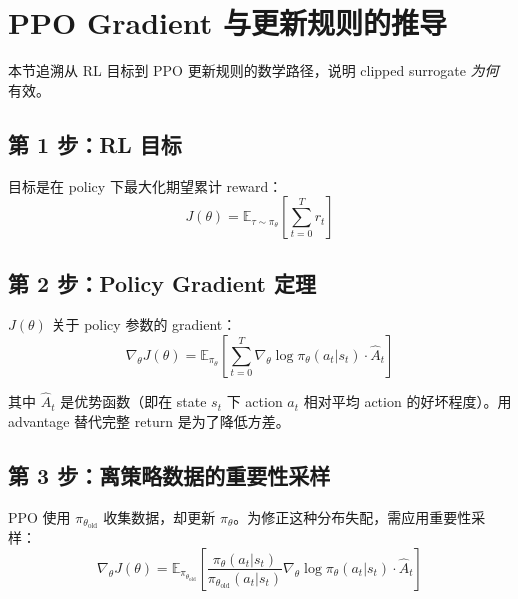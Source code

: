\section{PPO Gradient 与更新规则的推导}
\label{derivation-of-the-ppo-gradient-and-update-rule}

本节追溯从 RL 目标到 PPO 更新规则的数学路径，说明 clipped surrogate \emph{为何}有效。

\subsection{第 1 步：RL 目标}
\label{step-1-the-rl-objective}

目标是在 policy 下最大化期望累计 reward：
\begin{equation}
J(\theta) = \mathbb{E}_{\tau \sim \pi_\theta}\left[\sum_{t=0}^T r_t\right]
\end{equation}

\subsection{第 2 步：Policy Gradient 定理}
\label{step-2-policy-gradient-theorem}

$J(\theta)$ 关于 policy 参数的 gradient：
\begin{equation}
\boxed{\nabla_\theta J(\theta) = \mathbb{E}_{\pi_\theta}\left[\sum_{t=0}^T \nabla_\theta \log \pi_\theta(a_t|s_t) \cdot \hat{A}_t\right]}
\end{equation}

其中 $\hat{A}_t$ 是优势函数（即在 state $s_t$ 下 action $a_t$ 相对平均 action 的好坏程度）。用 advantage 替代完整 return 是为了降低方差。

\subsection{第 3 步：离策略数据的重要性采样}
\label{step-3-importance-sampling-for-off-policy-data}

PPO 使用 $\pi_{\theta_{\text{old}}}$ 收集数据，却更新 $\pi_\theta$。为修正这种分布失配，需应用重要性采样：
\begin{equation}
\nabla_\theta J(\theta) = \mathbb{E}_{\pi_{\theta_{\text{old}}}}\left[\frac{\pi_\theta(a_t|s_t)}{\pi_{\theta_{\text{old}}}(a_t|s_t)} \nabla_\theta \log \pi_\theta(a_t|s_t) \cdot \hat{A}_t\right]
\end{equation}

